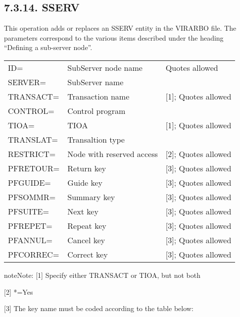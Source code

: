 \documentclass[letterpaper,10pt,english]{sphinxmanual}
\begin{document}
\subsection{7.3.14. SSERV}
\label{\detokenize{Installation_Guide:sserv}}
This operation adds or replaces an SSERV entity in the VIRARBO file. The parameters correspond to the various items described under the heading “Defining a sub-server node”.


\begin{savenotes}\sphinxattablestart
\centering
\begin{tabulary}{\linewidth}[t]{|T|T|T|}
\hline
{}\relax &\relax &\relax \\
\hline
ID=
&
SubServer node name
&
Quotes allowed
\\
\hline
SERVER=
&
SubServer name
&\\
\hline
TRANSACT=
&
Transaction name
&
{[}1{]}; Quotes allowed
\\
\hline
CONTROL=
&
Control program
&\\
\hline
TIOA=
&
TIOA
&
{[}1{]}; Quotes allowed
\\
\hline
TRANSLAT=
&
Transaltion type
&\\
\hline
RESTRICT=
&
Node with reserved
access
&
{[}2{]}; Quotes allowed
\\
\hline
PFRETOUR=
&
Return key
&
{[}3{]}; Quotes allowed
\\
\hline
PFGUIDE=
&
Guide key
&
{[}3{]}; Quotes allowed
\\
\hline
PFSOMMR=
&
Summary key
&
{[}3{]}; Quotes allowed
\\
\hline
PFSUITE=
&
Next key
&
{[}3{]}; Quotes allowed
\\
\hline
PFREPET=
&
Repeat key
&
{[}3{]}; Quotes allowed
\\
\hline
PFANNUL=
&
Cancel key
&
{[}3{]}; Quotes allowed
\\
\hline
PFCORREC=
&
Correct key
&
{[}3{]}; Quotes allowed
\\
\hline
\end{tabulary}
\par
\sphinxattableend\end{savenotes}

\begin{sphinxadmonition}{note}{Note:}
{[}1{]}  Specify either TRANSACT or TIOA, but not both

{[}2{]}  *=Yes

{[}3{]}  The key name must be coded according to the table below:
\end{sphinxadmonition}
\end{document}
